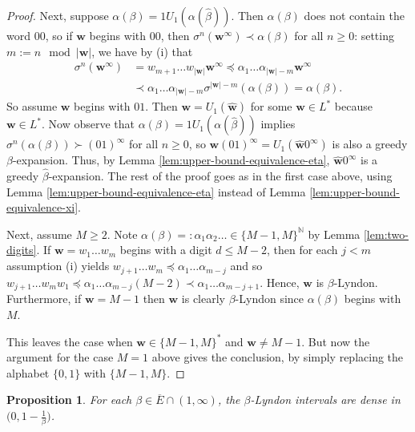\documentclass[11pt]{amsart}
\newtheorem{proposition}[theorem]{Proposition}
\theoremstyle{definition}
\theoremstyle{remark}
\numberwithin{equation}{section}
\newcommand{\N}{\ensuremath{\mathbb{N}}}
\newcommand{\w}{\mathbf{w}}
\newcommand{\f}{\infty}
\newcommand{\al}{\alpha}
\newcommand{\lle}{\preccurlyeq}
\newcommand{\si}{\sigma}
\begin{document}
\begin{proof}
Next, suppose $\al(\beta)=1U_1(\al(\hat{\beta}))$. Then $\al(\beta)$ does not contain the word $00$, so if $\w$ begins with $00$, then $\si^n(\w^\f)\prec\al(\beta)$ for all $n\geq 0$: setting $m:=n\!\!\mod |\w|$, we have {by (i) that}
\begin{align*}
\si^n(\w^\f)&=w_{m+1}\dots w_{|\w|}\w^\f\lle \al_1\dots \al_{|\w|-m}\w^\f\\
&\prec\al_1\dots\al_{|\w|-m}\si^{|\w|-m}(\al(\beta))=\al(\beta).
\end{align*}
So assume $\w$ begins with $01$. Then $\w=U_1(\hat{\w})$ for some $\hat{\w}\in L^*$ because $\w\in L^*$. Now observe that $\al(\beta)=1U_1(\al(\hat{\beta}))$ implies $\si^n(\al(\beta))\succ(01)^\f$ for all $n\geq 0$, so $\w(01)^\f=U_1(\hat{\w}0^\f)$ is also a greedy $\beta$-expansion. Thus, by Lemma \ref{lem:upper-bound-equivalence-eta}, $\hat{\w}0^\f$ is a greedy $\hat{\beta}$-expansion.
The rest of the proof goes as in the first case above, using Lemma \ref{lem:upper-bound-equivalence-eta} instead of Lemma \ref{lem:upper-bound-equivalence-xi}.

{
Next, assume $M\geq 2$. Note $\al(\beta)=:\al_1\al_2\dots\in\{M-1,M\}^\N$ by Lemma \ref{lem:two-digits}. 
If $\w=w_1\dots w_m$ begins with a digit $d\leq M-2$, then for each $j<m$ assumption (i) yields $w_{j+1}\dots w_m\lle \al_1\dots\al_{m-j}$ and so $w_{j+1}\dots w_m w_1\lle \al_1\dots\al_{m-j}(M-2)\prec\al_1\dots\al_{m-j+1}$. Hence, $\w$ is $\beta$-Lyndon. Furthermore, if $\w=M-1$ then $\w$ is clearly $\beta$-Lyndon since $\al(\beta)$ begins with $M$.

This leaves the case when $\w\in\{M-1,M\}^*$ and $\w\neq M-1$. But now the argument for the case $M=1$ above gives the conclusion, by simply replacing the alphabet $\{0,1\}$ with $\{M-1,M\}$.
}
\end{proof}

\begin{proposition} \label{prop:dense-intervals}
For each $\beta\in\overline{E}\cap{(1,\f)}$, the $\beta$-Lyndon intervals are dense in $\big(0,1-\frac{1}{\beta}\big)$.
\end{proposition}
\end{document}
